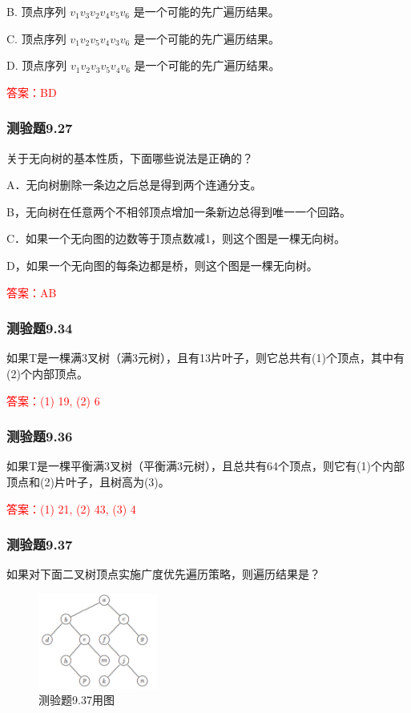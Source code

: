 \documentclass[UTF8, heading=true]{ctexart}
\begin{document}
B. 顶点序列 $v_1 v_3 v_2 v_4 v_5 v_6$ 是一个可能的先广遍历结果。

C. 顶点序列 $v_1 v_2 v_5 v_4 v_3 v_6$ 是一个可能的先广遍历结果。

D. 顶点序列 $v_1 v_2 v_3 v_5 v_4 v_6$ 是一个可能的先广遍历结果。

\textcolor{red}{答案：BD}

\subsubsection{测验题9.27}

关于无向树的基本性质，下面哪些说法是正确的？

A．无向树删除一条边之后总是得到两个连通分支。

B，无向树在任意两个不相邻顶点增加一条新边总得到唯一一个回路。

C．如果一个无向图的边数等于顶点数减1，则这个图是一棵无向树。

D，如果一个无向图的每条边都是桥，则这个图是一棵无向树。

\textcolor{red}{答案：AB}

\subsubsection{测验题9.34}

如果T是一棵满3叉树（满3元树），且有13片叶子，则它总共有(1)个顶点，其中有(2)个内部顶点。

\textcolor{red}{答案：(1) 19, (2) 6}

\subsubsection{测验题9.36}

如果T是一棵平衡满3叉树（平衡满3元树），且总共有64个顶点，则它有(1)个内部顶点和(2)片叶子，且树高为(3)。

\textcolor{red}{答案：(1) 21, (2) 43, (3) 4}

\subsubsection{测验题9.37}

如果对下面二叉树顶点实施广度优先遍历策略，则遍历结果是？

\begin{figure}[htbp]
  \centering
  \includegraphics[width=0.35\textwidth]{9.37.jpg} %
  \caption{测验题9.37用图}
\end{figure}
\end{document}
